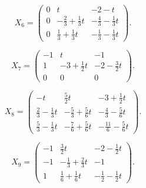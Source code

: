\[X_{6}=\begin{pmatrix}
0 & t & -2-t \\
0 & -\frac{2}{3}+\frac{1}{3}t & -\frac{4}{3}-\frac{1}{3}t \\
0 & \frac{1}{3}+\frac{1}{3}t & -\frac{1}{3}-\frac{1}{3}t
\end{pmatrix}.\]

\[X_{7}=\begin{pmatrix}
-1 & t & -1 \\
1 & -3+\frac{1}{2}t & -2-\frac{3}{2}t \\
0 & 0 & 0
\end{pmatrix}.\]

\[X_{8}=\begin{pmatrix}
-t & \frac{5}{2}t & -3+\frac{1}{2}t \\
\frac{2}{3}-\frac{1}{3}t & -\frac{5}{3}+\frac{5}{6}t & -\frac{4}{3}-\frac{5}{6}t \\
\frac{5}{3}-\frac{1}{3}t & -\frac{7}{6}+\frac{5}{6}t & -\frac{11}{6}-\frac{5}{6}t
\end{pmatrix}.\]

\[X_{9}=\begin{pmatrix}
-1 & \frac{3}{2}t & -2-\frac{1}{2}t \\
-1 & -\frac{1}{3}+\frac{2}{3}t & -1 \\
1 & \frac{1}{6}+\frac{1}{6}t & -\frac{1}{2}-\frac{1}{2}t
\end{pmatrix}.\]

